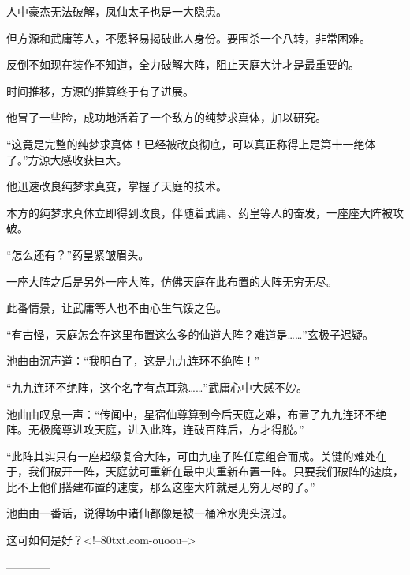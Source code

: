 \begin{this_body}
人中豪杰无法破解，凤仙太子也是一大隐患。

但方源和武庸等人，不愿轻易揭破此人身份。要围杀一个八转，非常困难。

反倒不如现在装作不知道，全力破解大阵，阻止天庭大计才是最重要的。

时间推移，方源的推算终于有了进展。

他冒了一些险，成功地活着了一个敌方的纯梦求真体，加以研究。

“这竟是完整的纯梦求真体！已经被改良彻底，可以真正称得上是第十一绝体了。”方源大感收获巨大。

他迅速改良纯梦求真变，掌握了天庭的技术。

本方的纯梦求真体立即得到改良，伴随着武庸、药皇等人的奋发，一座座大阵被攻破。

“怎么还有？”药皇紧皱眉头。

一座大阵之后是另外一座大阵，仿佛天庭在此布置的大阵无穷无尽。

此番情景，让武庸等人也不由心生气馁之色。

“有古怪，天庭怎会在这里布置这么多的仙道大阵？难道是……”玄极子迟疑。

池曲由沉声道：“我明白了，这是九九连环不绝阵！”

“九九连环不绝阵，这个名字有点耳熟……”武庸心中大感不妙。

池曲由叹息一声：“传闻中，星宿仙尊算到今后天庭之难，布置了九九连环不绝阵。无极魔尊进攻天庭，进入此阵，连破百阵后，方才得脱。”

“此阵其实只有一座超级复合大阵，可由九座子阵任意组合而成。关键的难处在于，我们破开一阵，天庭就可重新在最中央重新布置一阵。只要我们破阵的速度，比不上他们搭建布置的速度，那么这座大阵就是无穷无尽的了。”

池曲由一番话，说得场中诸仙都像是被一桶冷水兜头浇过。

这可如何是好？<!--80txt.com-ouoou-->

------------

\end{this_body}

